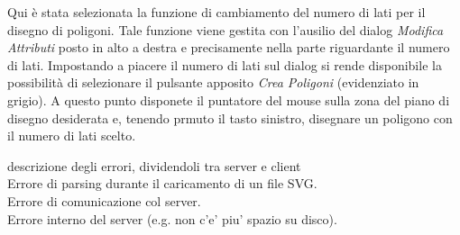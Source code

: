 \vspace{100pt}
\vspace{100pt}
Qui \`e stata selezionata la funzione di cambiamento del numero di lati per il disegno di poligoni. Tale funzione viene gestita con l'ausilio del dialog \textit{Modifica Attributi} posto in alto a destra e precisamente nella parte riguardante il numero di lati. Impostando a piacere il numero di lati sul dialog si rende disponibile la possibilit\`a di selezionare il pulsante apposito \textit{Crea Poligoni} (evidenziato in grigio). A questo punto disponete il puntatore del mouse sulla zona del piano di disegno desiderata e, tenendo prmuto il tasto sinistro, disegnare un poligono con il numero di lati scelto.  


descrizione degli errori, dividendoli tra server e client\\
Errore di parsing durante il caricamento di un file SVG.\\
Errore di comunicazione col server. \\
Errore interno del server (e.g. non c'e' piu' spazio su disco).\\


